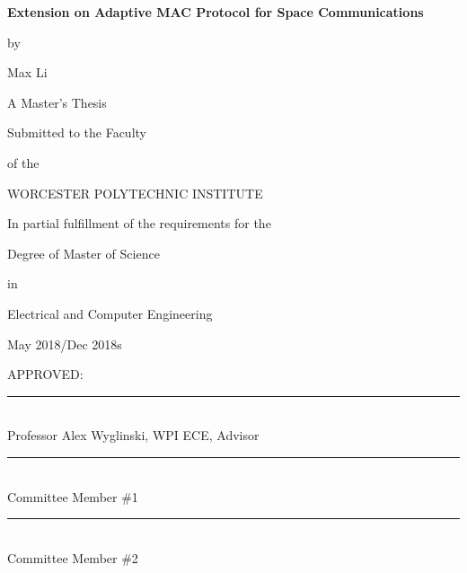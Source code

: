 \documentclass[12pt]{report}
\begin{document}
	\newcommand{\brk}{\vspace*{0.18in}}
	
	\thispagestyle{empty}
	
	\begin{center}
		
		\brk
		
		
		{\large 
			\textbf{
				Extension on Adaptive MAC Protocol for Space Communications
			}
		}		
		
		\brk
		by
		
		\brk
		Max Li
		
		\brk
		\brk
		A Master's Thesis
		
		\brk
		Submitted to the Faculty 
		
		\brk
		of the
		
		\brk
		\brk
		WORCESTER POLYTECHNIC INSTITUTE
		
		\brk
		\brk
		In partial fulfillment of the requirements for the
		
		\brk
		Degree of Master of Science
		
		\brk
		in
		
		\brk
		Electrical and Computer Engineering
		
		\brk
		May 2018/Dec 2018s
	\end{center}
	
	\setlength{\parindent}{0pt}
	\brk
	\brk
	\brk
	APPROVED:\\

	\rule{3in}{0.8pt}\\
	Professor Alex Wyglinski, WPI ECE, Advisor\\

    \rule{3in}{0.8pt}\\
	Committee Member \#1\\

    \rule{3in}{0.8pt}\\
    Committee Member \#2\\
\end{document}
